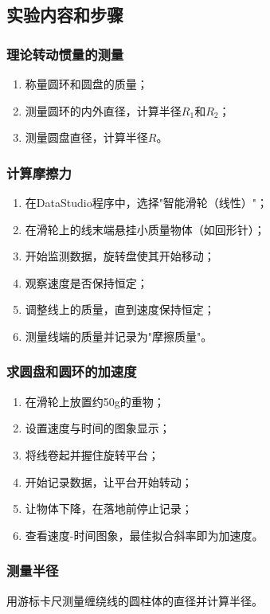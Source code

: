\documentclass[dvipsnames, svgnames,a4paper,11pt]{article}
\begin{document}

\subsection{实验内容和步骤}

\subsubsection{理论转动惯量的测量}
\begin{enumerate}
	\item 称量圆环和圆盘的质量；
	\item 测量圆环的内外直径，计算半径$R_1$和$R_2$；
	\item 测量圆盘直径，计算半径$R$。
\end{enumerate}

\subsubsection{计算摩擦力}
\begin{enumerate}
	\item 在DataStudio程序中，选择"智能滑轮（线性）"；
	\item 在滑轮上的线末端悬挂小质量物体（如回形针）；
	\item 开始监测数据，旋转盘使其开始移动；
	\item 观察速度是否保持恒定；
	\item 调整线上的质量，直到速度保持恒定；
	\item 测量线端的质量并记录为"摩擦质量"。
\end{enumerate}

\subsubsection{求圆盘和圆环的加速度}
\begin{enumerate}
	\item 在滑轮上放置约50g的重物；
	\item 设置速度与时间的图象显示；
	\item 将线卷起并握住旋转平台；
	\item 开始记录数据，让平台开始转动；
	\item 让物体下降，在落地前停止记录；
	\item 查看速度-时间图象，最佳拟合斜率即为加速度。
\end{enumerate}

\subsubsection{测量半径}
用游标卡尺测量缠绕线的圆柱体的直径并计算半径。
\end{document}
